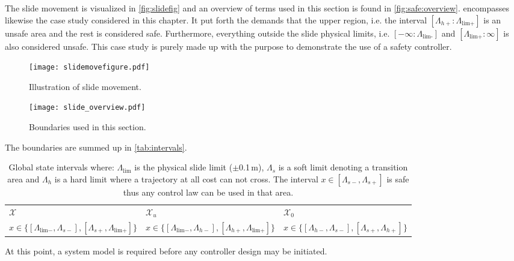 The slide movement is visualized in \autoref{fig:slidefig} and an overview of terms used in this section is found in \autoref{fig:safe:overview}.  encompasses likewise the case study considered in this chapter. It put forth the demands that the upper region, i.e. the interval $[\Lambda_{h+}:\Lambda_\text{lim+}]$ is an unsafe area and the rest is considered safe. Furthermore, everything outside the slide physical limits, i.e. $[-\infty:\Lambda_\text{lim-}]$ and $[\Lambda_\text{lim+}:\infty]$ is also considered unsafe. This case study is purely made up with the purpose to demonstrate the use of a safety controller.
\begin{figure}[H]
    \centering
    \begin{minipage}{.5\textwidth}
        \centering
        \texttt{[image: slidemovefigure.pdf]}
        \caption{Illustration of slide movement.}
        \label{fig:slidefig}
    \end{minipage}%
    \begin{minipage}{0.5\textwidth}
        \centering
        \texttt{[image: slide\_overview.pdf]}
        \caption{Boundaries used in this section.}
        \label{fig:safe:overview}
    \end{minipage}
\end{figure}
The boundaries are summed up in \autoref{tab:intervals}.
\begin{table}[H]
	\begin{tabularx}{\textwidth}{X X X }
\rowcolor{HeaderBlue} 
$\mathcal{X}$ & $\mathcal{X}_u$  & $\mathcal{X}_0$ \\
$x \in \{[\Lambda_{\text{lim}-},\Lambda_{s-}],[\Lambda_{s+},\Lambda_{\text{lim}+}]\}$  & $x \in \{[\Lambda_{\text{lim}-},\Lambda_{h-}],[\Lambda_{h+},\Lambda_{\text{lim}+}]\} $ & $x \in \{[\Lambda_{h-},\Lambda_{s-}],[\Lambda_{s+},\Lambda_{h+}]\}$  \\
\end{tabularx}
\caption{Global state intervals where: $\Lambda_\text{lim}$ is the physical slide limit ($\pm$0.1\,m), $\Lambda_s$ is a soft limit denoting a transition area and $\Lambda_h$ is a hard limit where a trajectory at all cost can not cross. The interval $x \in [\Lambda_{s-},\Lambda_{s+}]$ is safe thus any control law can be used in that area.}
\label{tab:intervals}
\end{table}
At this point, a system model is required before any controller design may be initiated.
